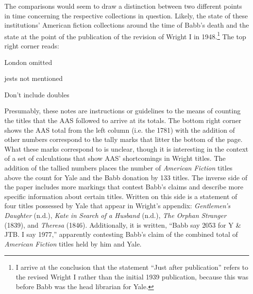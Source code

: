 The comparisons would seem to draw a distinction between two different points in time concerning the respective collections in question. Likely, the state of these institutions' American fiction collections around the time of Babb's death and the state at the point of the publication of the revision of Wright I in 1948.\footnote{I arrive at the conclusion that the statement ``Just after publication'' refers to the revised Wright I rather than the initial 1939 publication, because this was before Babb was the head librarian for Yale.} The top right corner reads: 
\begin{displayquote}
London omitted 

jests not mentioned 

Don't include doubles
\end{displayquote}

Presumably, these notes are instructions or guidelines to the means of counting the titles that the AAS followed to arrive at its totals. The bottom right corner shows the AAS total from the left column (i.e. the 1781) with the addition of other numbers correspond to the tally marks that litter the bottom of the page. What these marks correspond to is unclear, though it is interesting in the context of a set of calculations that show AAS' shortcomings in Wright titles. The addition of the tallied numbers places the number of \textit{American Fiction} titles above the count for Yale and the Babb donation by 133 titles. The inverse side of the paper includes more markings that contest Babb's claims and describe more specific information about certain titles. Written on this side is a statement of four titles possessed by Yale that appear in Wright's appendix: \textit{Gentlemen's Daughter} (n.d.), \textit{Kate in Search of a Husband} (n.d.), \textit{The Orphan Stranger} (1839), and \textit{Theresa} (1846). Additionally, it is written, ``Babb say 2053 for Y \& JTB. I say 1977,'' apparently contesting Babb's claim of the combined total of \textit{American Fiction} titles held by him and Yale.

